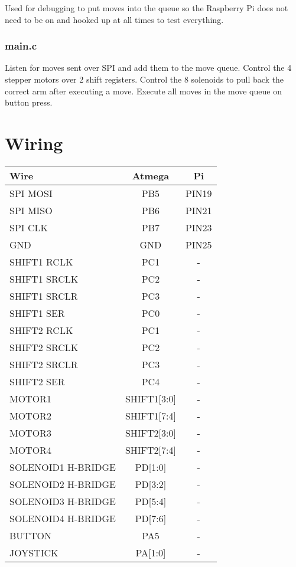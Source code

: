 Used for debugging to put moves into the queue so the Raspberry Pi does not need to be on and hooked up at all times to test everything. 

\subsubsection{main.c}

Listen for moves sent over SPI and add them to the move queue. Control the 4 stepper motors over 2 shift registers. Control the 8 solenoids to pull back the correct arm after executing a move. Execute all moves in the move queue on button press.

\section{Wiring}

\begin{center}
  \begin{tabular}{ | l | c | c | }
    \hline
    Wire & Atmega & Pi \\ \hline
    SPI MOSI & PB5 & PIN19 \\ 
    SPI MISO & PB6 & PIN21 \\ 
    SPI CLK & PB7 & PIN23  \\ 
    GND & GND & PIN25 \\ \hline
    SHIFT1 RCLK & PC1 & - \\
    SHIFT1 SRCLK & PC2 & - \\
    SHIFT1 SRCLR & PC3 & - \\
    SHIFT1 SER & PC0 & - \\ \hline
    SHIFT2 RCLK & PC1 & - \\
    SHIFT2 SRCLK & PC2 & - \\
    SHIFT2 SRCLR & PC3 & - \\
    SHIFT2 SER & PC4 & - \\ \hline
    MOTOR1 & SHIFT1[3:0] & - \\ 
    MOTOR2 & SHIFT1[7:4] & - \\ 
    MOTOR3 & SHIFT2[3:0] & - \\
    MOTOR4 & SHIFT2[7:4] & - \\ \hline
    SOLENOID1 H-BRIDGE & PD[1:0] & - \\
    SOLENOID2 H-BRIDGE & PD[3:2] & - \\
    SOLENOID3 H-BRIDGE & PD[5:4] & - \\
    SOLENOID4 H-BRIDGE & PD[7:6] & - \\ \hline
    BUTTON & PA5 & - \\ \hline
    JOYSTICK & PA[1:0] & - \\ \hline

    \hline
  \end{tabular}
\end{center}

